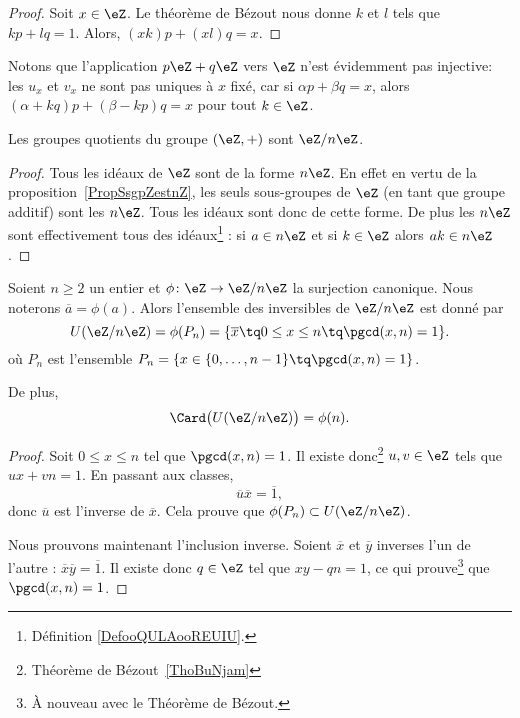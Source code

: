 \begin{proof}
	Soit \( x\in \eZ\). Le théorème de Bézout nous donne \( k\) et \( l\) tels que \( kp+lq=1\). Alors, \( (xk)p+(xl)q=x\).
\end{proof}

Notons que l'application \( p\eZ+q\eZ\) vers \( \eZ\) n'est évidemment pas injective: les \( u_x\) et \( v_x\) ne sont pas uniques à \( x\) fixé, car si \( \alpha p+\beta q=x\), alors \( (\alpha+kq)p+(\beta-kp)q=x\) pour tout \( k\in \eZ\).


\begin{corollary}       \label{CORooLINXooBlUKPG}
	Les groupes quotients du groupe \( (\eZ,+)\) sont \( \eZ/n\eZ\).
\end{corollary}

\begin{proof}
	Tous les idéaux de \( \eZ\) sont de la forme \( n\eZ\). En effet en vertu de la proposition~\ref{PropSsgpZestnZ}, les seuls sous-groupes de \( \eZ\) (en tant que groupe additif) sont les \( n\eZ\). Tous les idéaux sont donc de cette forme. De plus les \( n\eZ\) sont effectivement tous des idéaux\footnote{Définition \ref{DefooQULAooREUIU}.} : si \( a\in n\eZ\) et si \( k\in \eZ\) alors \( ak\in n\eZ\).
\end{proof}

\begin{proposition}     \label{PropZpintssiprempUzn}
	Soient \( n\geq 2\) un entier et \( \phi\colon \eZ\to \eZ/n\eZ\) la surjection canonique. Nous noterons \( \overline a=\phi(a)\). Alors l'ensemble des inversibles de \( \eZ/n\eZ\) est donné par
	\begin{equation}
		U(\eZ/n\eZ)=\phi(P_n)=\{ \overline x\tq 0\leq x\leq n\tq\pgcd(x,n)=1 \}.
	\end{equation}
	où \( P_n\) est l'ensemble \( P_n=\{ x\in\{ 0,\ldots,n-1 \}\tq\pgcd(x,n)=1 \}\).

	De plus,
	\begin{equation}
		\Card\big( U(\eZ/n\eZ) \big)=\phi(n).
	\end{equation}
\end{proposition}

\begin{proof}
	Soit \( 0\leq x\leq n\) tel que \( \pgcd(x,n)=1\). Il existe donc\footnote{Théorème de Bézout~\ref{ThoBuNjam}} \( u,v\in\eZ\) tels que \( ux+vn=1\). En passant aux classes,
	\begin{equation}
		\overline u\overline x=\overline 1,
	\end{equation}
	donc \( \overline u\) est l'inverse de \( \overline x\). Cela prouve que \( \phi(P_n)\subset U(\eZ/n\eZ)\).

	Nous prouvons maintenant l'inclusion inverse. Soient \( \overline x\) et \( \overline y\) inverses l'un de l'autre : \( \overline x\overline y=\overline 1\). Il existe donc \( q\in\eZ\) tel que \( xy-qn=1\), ce qui prouve\footnote{À nouveau avec le Théorème de Bézout.} que \( \pgcd(x,n)=1\).
\end{proof}



